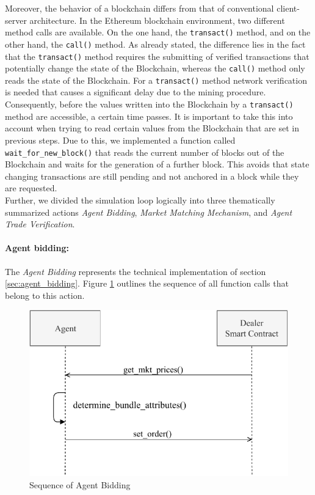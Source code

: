 Moreover, the behavior of a blockchain differs from that of conventional client-server architecture.
In the Ethereum blockchain environment, two different method calls are available. 
On the one hand, the \verb|transact()| method, and on the other hand, the \verb|call()| method.
As already stated, the difference lies in the fact that the \verb|transact()| method 
requires the submitting of verified transactions that potentially change the state of the Blockchain, 
whereas the \verb|call()| method only reads the state of the Blockchain. For a \verb|transact()| method 
network verification is needed that causes a significant delay due to the mining procedure.
Consequently, before the values written into the Blockchain by a \verb|transact()| method are accessible, 
a certain time passes. It is important to take this into account when trying to read certain 
values from the Blockchain that are set in previous steps. 
Due to this, we implemented a function called \verb|wait_for_new_block()| that 
reads the current number of blocks out of the Blockchain and waits for the generation of a 
further block. This avoids that state changing transactions are still pending and not anchored 
in a block while they are requested.\\

Further, we divided the simulation loop logically into three thematically summarized actions 
\textit{Agent Bidding}, \textit{Market Matching Mechanism}, and \textit{Agent Trade Verification}.


\paragraph{Agent bidding:}
The \textit{Agent Bidding} represents the technical implementation of section \ref{sec:agent_bidding}.
Figure \ref{figure:agent_bidding_figure} outlines the sequence of all function calls that belong 
to this action.


\begin{figure}[htbp]
	\centering
	\includegraphics[width=.8\linewidth]{./figures/agent_bidding.pdf}
	\caption{Sequence of Agent Bidding}
	\label{figure:agent_bidding_figure}
\end{figure}

